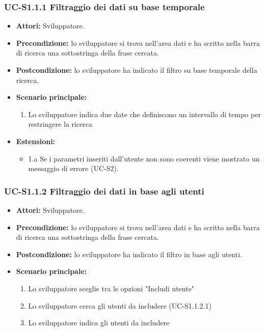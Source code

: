 	\subsubsection{UC-S1.1.1 Filtraggio dei dati su base temporale}	
		\begin{itemize}
			\item \textbf{Attori:} Sviluppatore.
			\item \textbf{Precondizione:} lo sviluppatore si trova nell'area dati e ha scritto nella barra di ricerca una sottostringa della frase cercata.
			\item \textbf{Postcondizione:} lo sviluppatore ha indicato il filtro su base temporale della ricerca.
			\item \textbf{Scenario principale:}
				\begin{enumerate}
					\item Lo sviluppatore indica due date che definiscono un intervallo di tempo per restringere la ricerca
				\end{enumerate}
			\item \textbf{Estensioni:}
				\begin{itemize}
					\item 1.a Se i parametri inseriti dall'utente non sono coerenti viene mostrato un messaggio di errore (UC-S2).
				\end{itemize}		
		\end{itemize}

	\subsubsection{UC-S1.1.2 Filtraggio dei dati in base agli utenti}	
		\begin{itemize}
			\item \textbf{Attori:} Sviluppatore.
			\item \textbf{Precondizione:} lo sviluppatore si trova nell'area dati e ha scritto nella barra di ricerca una sottostringa della frase cercata.
			\item \textbf{Postcondizione:} lo sviluppatore ha indicato il filtro in base agli utenti.
			\item \textbf{Scenario principale:}
				\begin{enumerate}
					\item Lo sviluppatore sceglie tra le opzioni "Includi utente"
					\item Lo sviluppatore cerca gli utenti da includere (UC-S1.1.2.1)
					\item Lo sviluppatore indica gli utenti da includere
				\end{enumerate}
		\end{itemize}
		

